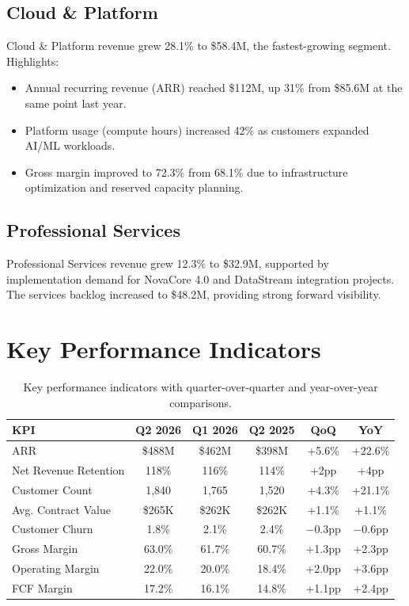 \documentclass[
    language=english,
    doctype=financial-report,
    institution=none,
]{../../omnilatex}
\begin{document}
\subsection{Cloud \& Platform}

Cloud \& Platform revenue grew 28.1\% to \$58.4M, the fastest-growing
segment. Highlights:

\begin{itemize}
    \item Annual recurring revenue (ARR) reached \$112M, up 31\% from
          \$85.6M at the same point last year.
    \item Platform usage (compute hours) increased 42\% as customers
          expanded AI/ML workloads.
    \item Gross margin improved to 72.3\% from 68.1\% due to infrastructure
          optimization and reserved capacity planning.
\end{itemize}

\subsection{Professional Services}

Professional Services revenue grew 12.3\% to \$32.9M, supported by
implementation demand for NovaCore 4.0 and DataStream integration projects.
The services backlog increased to \$48.2M, providing strong forward
visibility.

\section{Key Performance Indicators}

\begin{table}[h]
    \centering
    \begin{tabular}{lccccc}
        \toprule
        \textbf{KPI} & \textbf{Q2 2026} & \textbf{Q1 2026} & \textbf{Q2 2025} & \textbf{QoQ} & \textbf{YoY} \\
        \midrule
        ARR                & \$488M  & \$462M  & \$398M  & +5.6\%  & +22.6\% \\
        Net Revenue Retention & 118\% & 116\%  & 114\%   & +2pp    & +4pp    \\
        Customer Count     & 1,840   & 1,765   & 1,520   & +4.3\%  & +21.1\% \\
        Avg. Contract Value & \$265K & \$262K  & \$262K  & +1.1\%  & +1.1\%  \\
        Customer Churn     & 1.8\%   & 2.1\%   & 2.4\%   & $-$0.3pp & $-$0.6pp \\
        Gross Margin       & 63.0\%  & 61.7\%  & 60.7\%  & +1.3pp  & +2.3pp  \\
        Operating Margin   & 22.0\%  & 20.0\%  & 18.4\%  & +2.0pp  & +3.6pp  \\
        FCF Margin         & 17.2\%  & 16.1\%  & 14.8\%  & +1.1pp  & +2.4pp  \\
        \bottomrule
    \end{tabular}
    \caption{Key performance indicators with quarter-over-quarter and year-over-year comparisons.}
\end{table}
\end{document}
